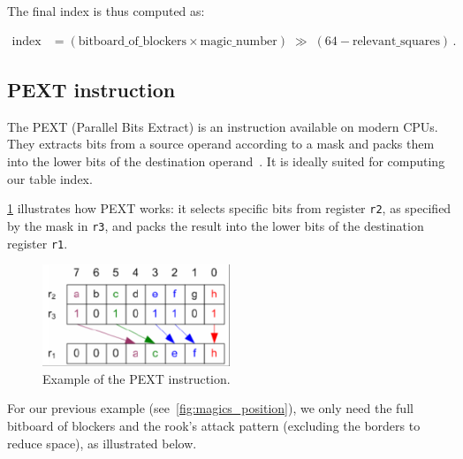 \noindent The final index is thus computed as:

\begin{align*}
    \text{index} 
    &= (\text{bitboard\_of\_blockers} \times \text{magic\_number})
       \;\gg\;(64 - \text{relevant\_squares})\,.
\end{align*}

\subsection*{PEXT instruction}

\noindent The PEXT (Parallel Bits Extract) is an instruction available on modern CPUs. They extracts bits from a source operand according to a mask and packs them into the lower bits of the destination operand~\cite{PextInstruction}. It is ideally suited for computing our table index.

\vspace{1em}

\noindent\cref{fig:pext_instruction_example} illustrates how PEXT works: it selects specific bits from register \texttt{r2}, as specified by the mask in \texttt{r3}, and packs the result into the lower bits of the destination register \texttt{r1}.

\vspace{1em}

\begin{figure}[H]
    \centering
    \includegraphics[width=0.5\textwidth]{Imagenes/pext.png}
    \caption{Example of the PEXT instruction.}\label{fig:pext_instruction_example}
\end{figure}

\noindent For our previous example (see~\cref{fig:magics_position}), we only need the full bitboard of blockers and the rook's attack pattern (excluding the borders to reduce space), as illustrated below.

\vspace{1em}

